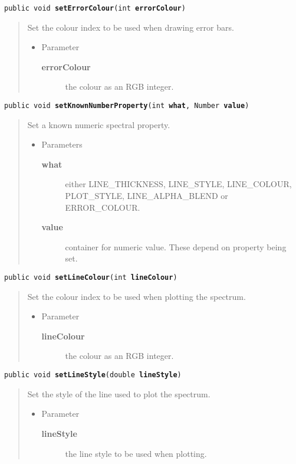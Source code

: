 \documentclass[twoside,11pt,nolof]{starlink}
\providecommand{\method}[1]{\texttt{#1}}
\newenvironment{desc}{\begin{quote}}{\end{quote}}
\begin{document}
\method{public void \textbf{setErrorColour}(\texttt{int} \textbf{errorColour})\label{l101}\label{l102}}
\begin{desc}Set the colour index to be used when drawing error bars.
\begin{itemize}
\item{Parameter
  \begin{description}
   \item[\textbf{errorColour}]{the colour as an RGB integer.}
  \end{description}}
\end{itemize}
\end{desc}

\method{public void \textbf{setKnownNumberProperty}(\texttt{int} \textbf{what}, \texttt{Number} \textbf{value})\label{l103}\label{l104}}
\begin{desc}Set a known numeric spectral property.
\begin{itemize}
\item{Parameters
  \begin{description}
   \item[\textbf{what}]{either LINE\_THICKNESS, LINE\_STYLE, LINE\_COLOUR,\\
             PLOT\_STYLE, LINE\_ALPHA\_BLEND or ERROR\_COLOUR.}
   \item[\textbf{value}]{container for numeric value. These depend on
              property being set.}
  \end{description}}
\end{itemize}
\end{desc}

\method{public void \textbf{setLineColour}(\texttt{int} \textbf{lineColour})\label{l105}\label{l106}}
\begin{desc}Set the colour index to be used when plotting the spectrum.
\begin{itemize}
\item{Parameter
  \begin{description}
   \item[\textbf{lineColour}]{the colour as an RGB integer.}
  \end{description}}
\end{itemize}
\end{desc}

\method{public void \textbf{setLineStyle}(\texttt{double} \textbf{lineStyle})\label{l107}\label{l108}}
\begin{desc}Set the style of the line used to plot the spectrum.
\begin{itemize}
\item{Parameter
  \begin{description}
   \item[\textbf{lineStyle}]{the line style to be used when plotting.}
  \end{description}}
\end{itemize}
\end{desc}
\end{document}
